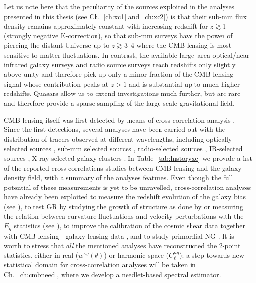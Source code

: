 Let us note here that the peculiarity of the sources exploited in the analyses presented in this thesis (see Ch.~\eqref{ch:xc1} and~\eqref{ch:xc2}) is that their sub-mm flux density remains approximately constant with increasing redshift for $z \gtrsim 1$ (strongly negative K-correction), so that sub-mm surveys have the power of piercing the distant Universe up to $z \gtrsim 3$--4 where the \gls{CMB} lensing is most sensitive to matter fluctuations. In contrast, the available large--area optical/near-infrared galaxy surveys and radio source surveys reach redshifts only slightly above unity and therefore pick up only a minor fraction of the CMB lensing signal whose contribution peaks at $z > 1$ and is substantial up to much higher redshifts. Quasars allow us to extend investigations much further, but are rare and therefore provide a sparse sampling of the large-scale gravitational field. 

\gls{CMB} lensing itself was first detected by means of cross-correlation analysis \citep{Smith2007,Hirata2008}. Since the first detections, several analyses have been carried out with the distribution of tracers observed at different wavelengths, including optically-selected sources \citep{Sherwin2012,Bleem2012,Ade2014c,Giannantonio2014,Omori2015,Kuntz2015,Giannantonio2016a,Pullen2016,Baxter2016,Singh2016}, sub-mm selected sources \citep{Bianchini2015,Bianchini2016a}, radio-selected sources \citep{Feng2012,Ade2014c,Allison2015a}, \gls{IR}-selected sources \citep{Bleem2012,Geach2013,DiPompeo2014,Giannantonio2014,DiPompeo2016},  X-ray-selected galaxy clusters \citep{Ade2014c}. In Table~\eqref{tab:historyxc} we provide a list of the reported cross-correlations studies between \gls{CMB} lensing and the galaxy density field, with a summary of the analyses features.
Even though the full potential of these measurements is yet to be unravelled, cross-correlation analyses have already been exploited to measure the redshift evolution of the galaxy bias (see \citet{Bianchini2015,Kuntz2015,Bianchini2016a,DiPompeo2016}), to test \gls{GR} by studying the growth of structure as done by \citet{Giannantonio2016a} or measuring the relation between curvature fluctuations and velocity perturbations with the $E_g$ statistics (see \citet{Pullen2016}), to improve the calibration of the cosmic shear data together with CMB lensing - galaxy lensing data \citep{Baxter2016}, and to study primordial-NG \citep{Giannantonio2014}. It is worth to stress that \textit{all} the mentioned analyses have reconstructed the 2-point statistics, either in real ($w^{\kappa g}(\theta)$) or harmonic space ($C_{\ell}^{\kappa g}$): a step towards new statistical domain for cross-correlation analyses will be taken in Ch.~\eqref{ch:cmbneed}, where we develop a needlet-based spectral estimator.

